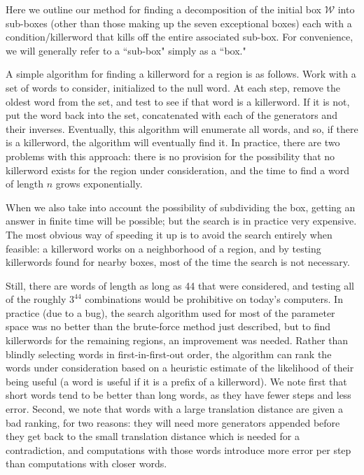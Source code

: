 \begin{remark}\label{GMT1.34}
Here we outline our method for finding a decomposition of the initial box $\mathcal {W}$ into sub-boxes (other than those making up the
 seven exceptional boxes)
each with a condition/killerword that kills off the entire associated sub-box.
For convenience, we will generally refer to a ``sub-box" simply as a ``box."

A simple algorithm for finding a killerword for a region is as follows.
Work with a set of words to consider, initialized to the null word.  At 
each step, remove the oldest word from the set, and test to see if that 
word is a killerword.
If it is not, put the word back into the set, concatenated with each of 
the generators and their inverses.
Eventually, this algorithm will enumerate all words, and so, if there 
is a killerword, the algorithm will eventually find it.  In practice, 
there are two problems with this approach: there is no provision for the possibility that no killerword exists for the region under consideration, 
and the time to find a word of length $n$ grows exponentially.

When we also take into account the possibility of subdividing the box, getting an answer in finite time will be possible; but the search is in practice 
very expensive.  The most obvious way of speeding it up is to avoid 
the search entirely when feasible: a killerword works on a neighborhood of a 
region, and by testing killerwords found for nearby boxes, most of 
the time the search is not necessary.

Still, there are words of length as long as 44 that were considered, and testing all of the roughly $3^{44}$ 
combinations would be prohibitive on today's computers.  In practice 
(due to a bug), the search algorithm used for most of the parameter
space was no better than the brute-force method just described, but to find 
killerwords for the remaining regions, an improvement was needed.  
Rather than blindly selecting words in first-in-first-out order, 
the algorithm can
rank the words under consideration based on a heuristic estimate of 
the likelihood of their being useful (a word is {\textit useful} if it is a prefix of a killerword).  
We note first that short words tend to be better than 
long words, as they have fewer steps and less error.
Second, we note that words 
with a large translation distance are given a bad ranking, for two reasons: 
they will need more generators appended before they get back to the 
small translation distance which is needed for a contradiction, and
 computations with those words introduce more error per step than 
computations with closer words.  


\end{remark}
